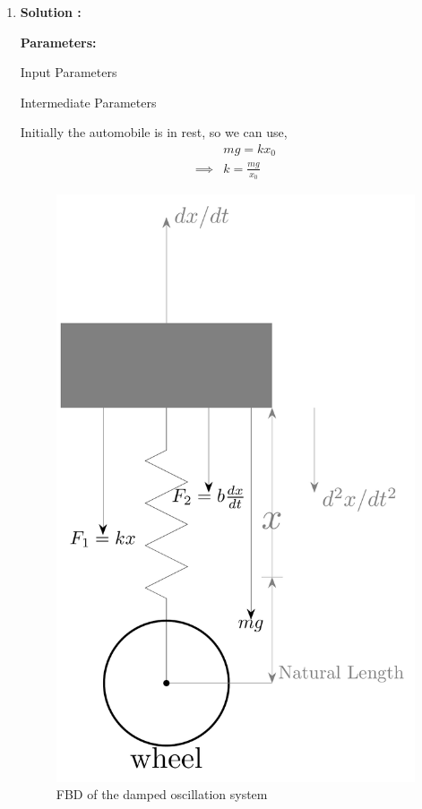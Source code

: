 \documentclass[journal,12pt,twocolumn]{IEEEtran}
\theoremstyle{remark}
\begin{document}
\begin{enumerate}
    \item \textbf{Solution :}


\textbf{Parameters:}
\begin{table}[h]
    
    \label{tab:Table-1}
    \vspace{5pt}
    \caption{Input Parameters}
\end{table}
\begin{table}[h]

\label{tab:Table-2}
\vspace{5pt}
\caption{Intermediate Parameters}
\end{table}

Initially the automobile is in rest, so we can use,
    \begin{align}
&mg = kx_0 \label{eq:1}\\
\implies &k=\frac{mg}{x_0} \label{eq:2}
    \end{align}

\begin{figure}[h]
        \centering
        \includegraphics[width=0.8\columnwidth]{11_14_21_fbd.pdf}
        \caption{FBD of the damped oscillation system}
        \label{fig:Fig-1}
    \end{figure}


\end{enumerate}
\end{document}
